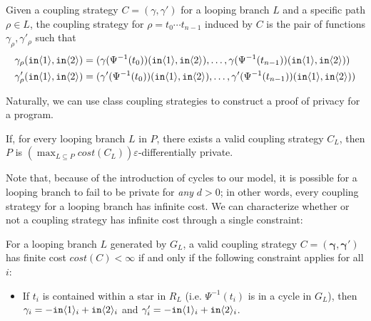 \begin{defn}\label{svInducedCouplingStrategy}
    Given a coupling strategy $C = (\gamma, \gamma')$ for a looping branch $L$ and a specific path $\rho\in L$, the coupling strategy for $\rho=t_0\cdots t_{n-1}$ induced by $C$ is the pair of functions $\gamma_\rho, \gamma'_\rho$ such that 
    \begin{align*}
        \gamma_\rho(\texttt{in}\langle1 \rangle, \texttt{in}\langle2 \rangle) &= (\gamma(\Psi^{-1}(t_0))(\texttt{in}\langle1 \rangle, \texttt{in}\langle2 \rangle), \ldots,\gamma(\Psi^{-1}(t_{n-1}))(\texttt{in}\langle1 \rangle, \texttt{in}\langle2 \rangle) )\\
        \gamma'_\rho(\texttt{in}\langle1 \rangle, \texttt{in}\langle2 \rangle) &= (\gamma'(\Psi^{-1}(t_0))(\texttt{in}\langle1 \rangle, \texttt{in}\langle2 \rangle),\ldots,\gamma'(\Psi^{-1}(t_{n-1}))(\texttt{in}\langle1 \rangle, \texttt{in}\langle2 \rangle) )
    \end{align*}
\end{defn}

Naturally, we can use class coupling strategies to construct a proof of privacy for a program.

\begin{lemma}
    If, for every looping branch $L$ in $P$, there exists a valid coupling strategy $C_L$, then $P$ is $(\max_{L\subseteq P} cost(C_L))\varepsilon$-differentially private. 
\end{lemma}


Note that, because of the introduction of cycles to our model, it is possible for a looping branch to fail to be private for \textit{any} $d>0$; in other words, every coupling strategy for a looping branch has infinite cost. We can characterize whether or not a coupling strategy has infinite cost through a single constraint:

\begin{lemma}\label{finiteCostConstraintLemma}
    For a looping branch $L$ generated by $G_L$, a valid coupling strategy $C = (\mathbf{\gamma}, \mathbf{\gamma}')$ has finite cost $cost(C)<\infty$ if and only if the following constraint applies for all $i$:
    \begin{itemize}
        \item If $t_i$ is contained within a star in $R_L$ (i.e. $\Psi^{-1}(t_i)$ is in a cycle in $G_L$), then $\gamma_i = -\texttt{in}\langle1 \rangle_i+\texttt{in}\langle2 \rangle_i$ and $\gamma_i' = -\texttt{in}\langle1 \rangle_i+\texttt{in}\langle2 \rangle_i$.
    \end{itemize}
\end{lemma}

